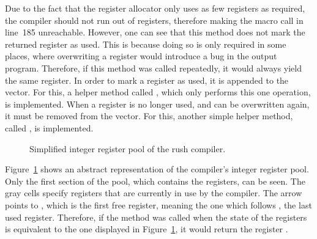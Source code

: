 Due to the fact that the register allocator only uses as few registers as required,
the compiler should not run out of registers,
therefore making the  macro call in line~185 unreachable.
However, one can see that this method does not mark the returned register as used.
This is because doing so is only required in some places, where overwriting a register would introduce a bug in the output program.
Therefore, if this method was called repeatedly, it would always yield the same register.
In order to mark a register as used, it is appended to the  vector.
For this, a helper method called , which only performs this one operation, is implemented.
When a register is no longer used, and can be overwritten again, it must be removed from the  vector.
For this, another simple helper method, called , is implemented.

\begin{figure}
	\centering
	\caption{Simplified integer register pool of the \riscv{} rush compiler.}\label{fig:riscv_iregister_pool}
\end{figure}

Figure~\ref{fig:riscv_iregister_pool} shows an abstract representation of the compiler's integer register pool.
Only the first section of the pool, which contains the  registers, can be seen.
The gray cells specify registers that are currently in use by the compiler.
The arrow points to , which is the first free register, meaning the one which follows , the last used register.
Therefore, if the  method was called when the state of the registers is equivalent to the one displayed in Figure~\ref{fig:riscv_iregister_pool}, it would return the register .

